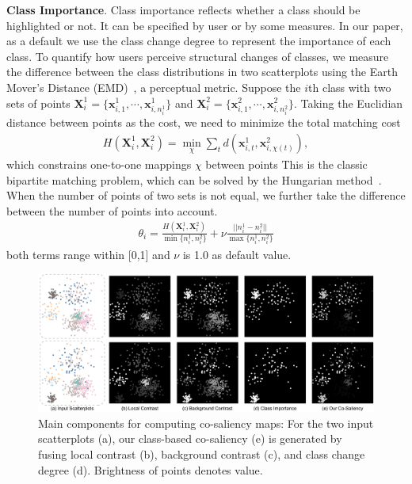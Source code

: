 \vspace{1.5mm}
\noindent\textbf{Class Importance}.
Class importance reflects whether a class should be highlighted or not. It can be specified by user or by some measures. In our paper, as a default we use the class change degree to represent the importance of each class.
To quantify how users perceive structural changes of classes, we measure the difference between the class distributions in two scatterplots using the Earth Mover's Distance (EMD)~\cite{rubner2000earth}, a perceptual metric.
Suppose the $i$th  class with two  sets of points $\mathbf{X}^1_i = \{\mathbf{x}_{i,1}^1, \cdots , \mathbf{x}_{i,n^1_i}^1\}$ and $\mathbf{X}^2_i = \{\mathbf{x}_{i,1}^2, \cdots , \mathbf{x}_{i,n^2_i}^2\}$.
Taking the Euclidian distance between points as the cost, we need to  minimize the total matching cost
\begin{align}
 H(\mathbf{X}^1_i, \mathbf{X}^2_i)  = \min_\chi \sum_t d(\mathbf{x}_{i,t}^1, \mathbf{x}_{i,\chi(t)}^2), \nonumber
\end{align}
which constrains one-to-one mappings $\chi$ between points %
This is the classic bipartite matching problem, which can be solved by the Hungarian method~\cite{kuhn1955hungarian}.
When the number of points of two sets is not equal, we further take the difference between the number of points into account. 
\begin{align}\label{eq:cm}
 \theta_i= \frac{H(\mathbf{X}^1_i, \mathbf{X}^2_i) }{\min\{n^1_i, n^2_i\}} + \nu \frac{||n^1_i- n^2_i||}{\max\{n^1_i, n^2_i\}}
\end{align}
both terms range within [0,1] and $\nu$ is 1.0 as default value.


\begin{figure}[!tb]
\centering
\includegraphics[width=\linewidth]{figures/saliencymap}
\caption{Main components for computing co-saliency maps: For the two input scatterplots (a), our class-based co-saliency (e) is generated by fusing  local contrast (b),  background contrast (c),  and class change degree (d). Brightness of points denotes value.
}
\vspace*{-3mm}
\label{fig:map}
\end{figure}
\vspace{1.5mm}


